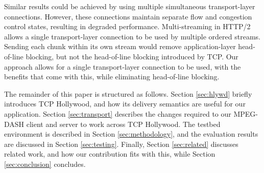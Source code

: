 
Similar results could be achieved by using multiple simultaneous transport-layer
connections. However, these connections maintain separate flow and congestion control
states, resulting in degraded performance. Multi-streaming in HTTP/2 allows a single
transport-layer connection to be used by multiple ordered streams. Sending each chunk
within its own stream would remove application-layer head-of-line blocking, but not the
head-of-line blocking introduced by TCP. Our approach allows for a single transport-layer
connection to be used, with the benefits that come with this, while eliminating
head-of-line blocking.


The remainder of this paper is structured as follows. Section \ref{sec:hlywd} briefly
introduces TCP Hollywood, and how its delivery semantics are useful for our application.
Section \ref{sec:transport} describes the changes required to our MPEG-DASH client and
server to work across TCP Hollywood. The testbed environment is described in Section
\ref{sec:methodology}, and the evaluation results are discussed in Section \ref{sec:testing}.
Finally, Section \ref{sec:related} discusses related work, and how our contribution fits
with this, while Section \ref{sec:conclusion} concludes.
